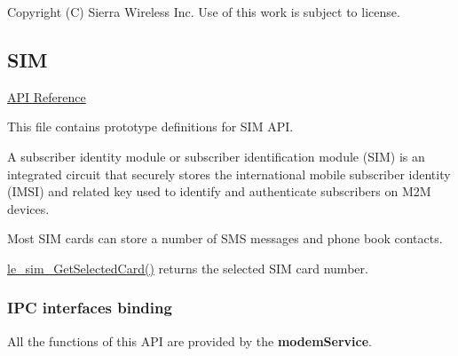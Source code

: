 Copyright (C) Sierra Wireless Inc. Use of this work is subject to license. \hypertarget{c_sim}{}\subsection{S\+I\+M}\label{c_sim}
\hyperlink{le__sim__interface_8h}{A\+P\+I Reference}





This file contains prototype definitions for S\+I\+M A\+P\+I.

A subscriber identity module or subscriber identification module (S\+I\+M) is an integrated circuit that securely stores the international mobile subscriber identity (I\+M\+S\+I) and related key used to identify and authenticate subscribers on M2\+M devices.

Most S\+I\+M cards can store a number of S\+M\+S messages and phone book contacts.

\hyperlink{le__sim__interface_8h_a4c9e3ded0485f14c66e4d51763f2de57}{le\+\_\+sim\+\_\+\+Get\+Selected\+Card()} returns the selected S\+I\+M card number.\hypertarget{c_sim_le_sim_binding}{}\subsubsection{I\+P\+C interfaces binding}\label{c_sim_le_sim_binding}
All the functions of this A\+P\+I are provided by the {\bfseries modem\+Service}.

